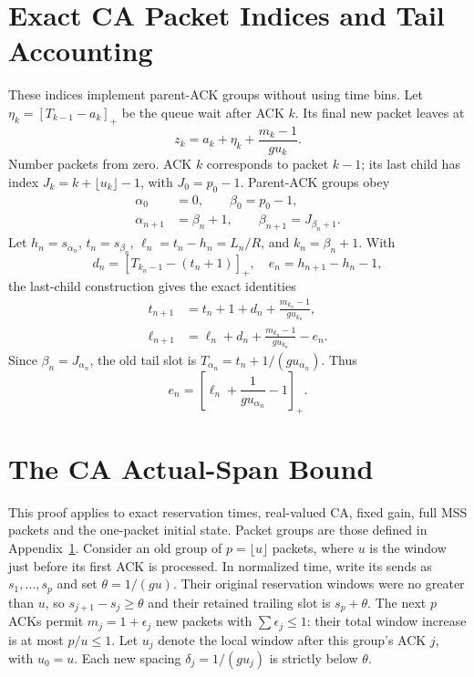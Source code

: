\documentclass[sigconf,nonacm]{acmart}
\begin{document}
\section{Exact CA Packet Indices and Tail Accounting}\label{app:caindices}
These indices implement parent-ACK groups without using time bins.
Let $\eta_k=[T_{k-1}-a_k]_+$ be the queue wait after ACK $k$. Its final
new packet leaves at
\begin{equation}
 z_k=a_k+\eta_k+\frac{m_k-1}{g u_k}.
 \label{eq:catail}
\end{equation}
Number packets from zero. ACK $k$ corresponds to packet $k-1$; its last child has index $J_k=k+\lfloor u_k\rfloor-1$, with $J_0=p_0-1$. Parent-ACK groups obey
\begin{equation}\begin{aligned}
 \alpha_0&=0,\qquad \beta_0=p_0-1,\\
 \alpha_{n+1}&=\beta_n+1,\qquad
 \beta_{n+1}=J_{\beta_n+1}.
\end{aligned}\label{eq:cagroups}\end{equation}
Let $h_n=s_{\alpha_n}$, $t_n=s_{\beta_n}$, $\ell_n=t_n-h_n=L_n/R$, and $k_n=\beta_n+1$. With
\[
 d_n=[T_{k_n-1}-(t_n+1)]_+,\quad
 e_n=h_{n+1}-h_n-1,
\]
the last-child construction gives the exact identities
\begin{equation}\begin{aligned}
 t_{n+1}&=t_n+1+d_n+\frac{m_{k_n}-1}{g u_{k_n}},\\
 \ell_{n+1}&=\ell_n+d_n+\frac{m_{k_n}-1}{g u_{k_n}}-e_n.
\end{aligned}\label{eq:catailspan}\end{equation}
Since $\beta_n=J_{\alpha_n}$, the old tail slot is $T_{\alpha_n}=t_n+1/(g u_{\alpha_n})$. Thus
\begin{equation}
 e_n=\left[\ell_n+\frac1{g u_{\alpha_n}}-1\right]_+.
\end{equation}

\section{The CA Actual-Span Bound}\label{app:caspan}
This proof applies to exact reservation times, real-valued CA, fixed gain,
full MSS packets and the one-packet initial state. Packet groups are those
defined in Appendix~\ref{app:caindices}.
Consider an old group of $p=\lfloor u\rfloor$ packets, where $u$ is the window just before its first ACK is processed. In normalized time, write its sends as $s_1,\ldots,s_p$ and set $\theta=1/(gu)$. Their original reservation windows were no greater than $u$, so $s_{j+1}-s_j\ge\theta$ and their retained trailing slot is $s_p+\theta$. The next $p$ ACKs permit $m_j=1+\epsilon_j$ new packets with $\sum\epsilon_j\le1$: their total window increase is at most $p/u\le1$. Let $u_j$ denote the local window after this group's ACK $j$, with $u_0=u$. Each new spacing $\delta_j=1/(g u_j)$ is strictly below $\theta$.
\end{document}

